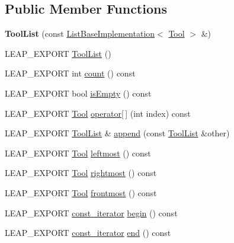 \subsection*{Public Member Functions}
\begin{DoxyCompactItemize}
\item 
\hypertarget{class_leap_1_1_tool_list_a28459f829ceca1ac6edfe5dd5f0a73d5}{{\bfseries Tool\+List} (const \hyperlink{class_leap_1_1_list_base_implementation}{List\+Base\+Implementation}$<$ \hyperlink{class_leap_1_1_tool}{Tool} $>$ \&)}\label{class_leap_1_1_tool_list_a28459f829ceca1ac6edfe5dd5f0a73d5}

\item 
L\+E\+A\+P\+\_\+\+E\+X\+P\+O\+R\+T \hyperlink{class_leap_1_1_tool_list_a3ee8e7e7b50f92b9d31ad31e7fd55c2e}{Tool\+List} ()
\item 
L\+E\+A\+P\+\_\+\+E\+X\+P\+O\+R\+T int \hyperlink{class_leap_1_1_tool_list_a385325630ca55bfcad1e5b06237fbcbb}{count} () const 
\item 
L\+E\+A\+P\+\_\+\+E\+X\+P\+O\+R\+T bool \hyperlink{class_leap_1_1_tool_list_a96832d98859addb02813fcba73cd1d2e}{is\+Empty} () const 
\item 
L\+E\+A\+P\+\_\+\+E\+X\+P\+O\+R\+T \hyperlink{class_leap_1_1_tool}{Tool} \hyperlink{class_leap_1_1_tool_list_ad9cb174832fe6d8a10592bced6ea2cb1}{operator\mbox{[}$\,$\mbox{]}} (int index) const 
\item 
L\+E\+A\+P\+\_\+\+E\+X\+P\+O\+R\+T \hyperlink{class_leap_1_1_tool_list}{Tool\+List} \& \hyperlink{class_leap_1_1_tool_list_a384adf507eeb1cfacc5aaa71a38ca452}{append} (const \hyperlink{class_leap_1_1_tool_list}{Tool\+List} \&other)
\item 
L\+E\+A\+P\+\_\+\+E\+X\+P\+O\+R\+T \hyperlink{class_leap_1_1_tool}{Tool} \hyperlink{class_leap_1_1_tool_list_ac22bad454f5086fcea7cc75de2a2cb7c}{leftmost} () const 
\item 
L\+E\+A\+P\+\_\+\+E\+X\+P\+O\+R\+T \hyperlink{class_leap_1_1_tool}{Tool} \hyperlink{class_leap_1_1_tool_list_abdd27a1e89f90a33af077f8827210487}{rightmost} () const 
\item 
L\+E\+A\+P\+\_\+\+E\+X\+P\+O\+R\+T \hyperlink{class_leap_1_1_tool}{Tool} \hyperlink{class_leap_1_1_tool_list_a6641d8cba062215cbf38982015145ffe}{frontmost} () const 
\item 
L\+E\+A\+P\+\_\+\+E\+X\+P\+O\+R\+T \hyperlink{class_leap_1_1_tool_list_a7f52ee5561016e8d42512e2adbc820de}{const\+\_\+iterator} \hyperlink{class_leap_1_1_tool_list_abf5d56a04145998fc85a7be12898f210}{begin} () const 
\item 
L\+E\+A\+P\+\_\+\+E\+X\+P\+O\+R\+T \hyperlink{class_leap_1_1_tool_list_a7f52ee5561016e8d42512e2adbc820de}{const\+\_\+iterator} \hyperlink{class_leap_1_1_tool_list_a42a50495878c9c4824f78391f6de637c}{end} () const 
\end{DoxyCompactItemize}
